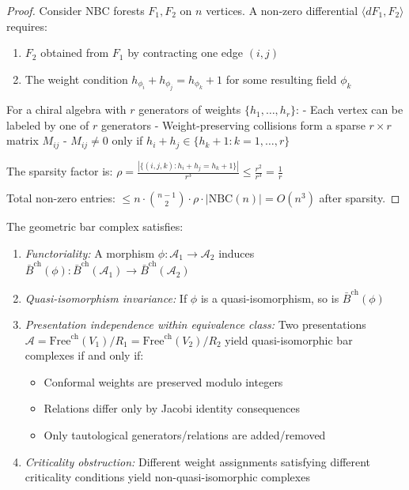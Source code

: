\begin{proof}
Consider NBC forests $F_1, F_2$ on $n$ vertices. A non-zero differential $\langle dF_1, F_2 \rangle$ requires:
\begin{enumerate}
\item $F_2$ obtained from $F_1$ by contracting one edge $(i,j)$
\item The weight condition $h_{\phi_i} + h_{\phi_j} = h_{\phi_k} + 1$ for some resulting field $\phi_k$
\end{enumerate}

For a chiral algebra with $r$ generators of weights $\{h_1, \ldots, h_r\}$:
- Each vertex can be labeled by one of $r$ generators
- Weight-preserving collisions form a sparse $r \times r$ matrix $M_{ij}$
- $M_{ij} \neq 0$ only if $h_i + h_j \in \{h_k + 1 : k = 1, \ldots, r\}$

The sparsity factor is:
$\rho = \frac{|\{(i,j,k) : h_i + h_j = h_k + 1\}|}{r^3} \leq \frac{r^2}{r^3} = \frac{1}{r}$

Total non-zero entries: $\leq n \cdot \binom{n-1}{2} \cdot \rho \cdot |\text{NBC}(n)| = O(n^3)$ after sparsity.
\end{proof}

\begin{theorem}\label{thm:presentation-independence}
   The geometric bar complex satisfies:
   \begin{enumerate}
   \item \emph{Functoriality:} A morphism $\phi: \mathcal{A}_1 \to \mathcal{A}_2$ induces 
   $\bar{B}^{\text{ch}}(\phi): \bar{B}^{\text{ch}}(\mathcal{A}_1) \to \bar{B}^{\text{ch}}(\mathcal{A}_2)$
   
   \item \emph{Quasi-isomorphism invariance:} If $\phi$ is a quasi-isomorphism, so is $\bar{B}^{\text{ch}}(\phi)$
   
   \item \emph{Presentation independence within equivalence class:} Two presentations 
   $\mathcal{A} = \text{Free}^{\text{ch}}(V_1)/R_1 = \text{Free}^{\text{ch}}(V_2)/R_2$ 
   yield quasi-isomorphic bar complexes if and only if:
      \begin{itemize}
      \item Conformal weights are preserved modulo integers
      \item Relations differ only by Jacobi identity consequences
      \item Only tautological generators/relations are added/removed
      \end{itemize}
      
   \item \emph{Criticality obstruction:} Different weight assignments satisfying different criticality 
   conditions yield non-quasi-isomorphic complexes
   \end{enumerate}
   \end{theorem}
   
